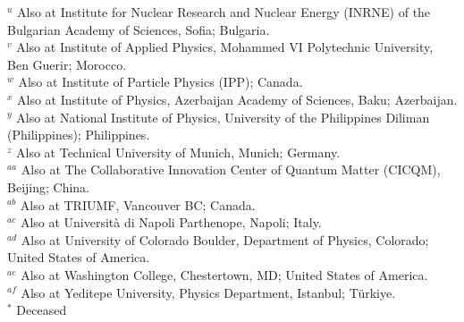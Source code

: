 \begin{flushleft}
$^{u}$ Also at Institute for Nuclear Research and Nuclear Energy (INRNE) of the Bulgarian Academy of Sciences, Sofia; Bulgaria.\\
$^{v}$ Also at Institute of Applied Physics, Mohammed VI Polytechnic University, Ben Guerir; Morocco.\\
$^{w}$ Also at Institute of Particle Physics (IPP); Canada.\\
$^{x}$ Also at Institute of Physics, Azerbaijan Academy of Sciences, Baku; Azerbaijan.\\
$^{y}$ Also at National Institute of Physics, University of the Philippines Diliman (Philippines); Philippines.\\
$^{z}$ Also at Technical University of Munich, Munich; Germany.\\
$^{aa}$ Also at The Collaborative Innovation Center of Quantum Matter (CICQM), Beijing; China.\\
$^{ab}$ Also at TRIUMF, Vancouver BC; Canada.\\
$^{ac}$ Also at Universit\`a  di Napoli Parthenope, Napoli; Italy.\\
$^{ad}$ Also at University of Colorado Boulder, Department of Physics, Colorado; United States of America.\\
$^{ae}$ Also at Washington College, Chestertown, MD; United States of America.\\
$^{af}$ Also at Yeditepe University, Physics Department, Istanbul; Türkiye.\\
$^{*}$ Deceased

\end{flushleft}

